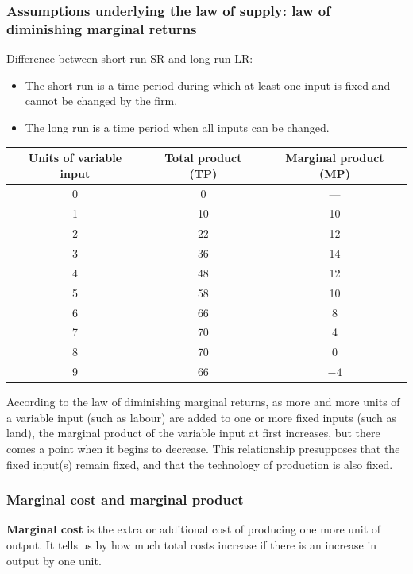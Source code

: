 \documentclass[a4paper,12pt]{article}
\newcommand{\needbold}[1]{\textcolor{red!70!black}{\textbf{#1}}}
\begin{document}
\subsubsection*{Assumptions underlying the law of supply: law of diminishing marginal returns}
Difference between short-run SR and long-run LR:
\begin{itemize}
  \item The short run is a time period during which at least one input is fixed and cannot be changed by the firm.
  \item The long run is a time period when all inputs can be changed.
\end{itemize}

\begin{center}
\begin{tabular}{ccc}
\toprule
\textbf{Units of variable input} & \textbf{Total product (TP)} & \textbf{Marginal product (MP)} \\
\midrule
0 & 0 & --- \\
1 & 10 & 10 \\
2 & 22 & 12 \\
3 & 36 & 14 \\
4 & 48 & 12 \\
5 & 58 & 10 \\
6 & 66 & 8 \\
7 & 70 & 4 \\
8 & 70 & 0 \\
9 & 66 & $-4$ \\
\bottomrule
\end{tabular}
\end{center}
According to the law of diminishing marginal returns, as more and more units of a variable input (such as labour) are added to one or more fixed inputs (such as land), the marginal product of the variable input at first increases, but there comes a point when it begins to decrease.
This relationship presupposes that the fixed input(s) remain fixed, and that the technology of production is also fixed.
\subsubsection*{Marginal cost and marginal product}
\needbold{Marginal cost} is the extra or additional cost of producing one more unit of output. It tells us by how much total costs increase if there is an increase in output by one unit.
\end{document}
